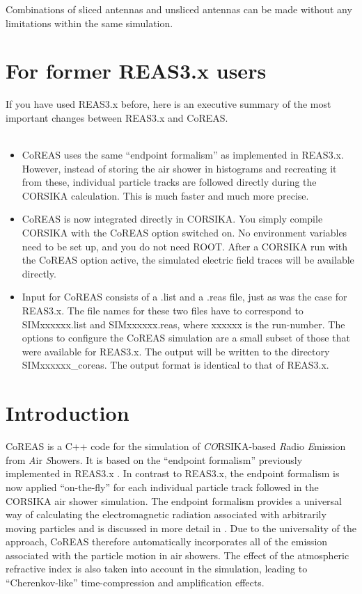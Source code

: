 \documentclass[a4paper,10pt]{article}
\begin{document}
Combinations of sliced antennas and unsliced antennas can be made without any limitations within the same simulation.

\section{For former REAS3.x users}

If you have used REAS3.x before, here is an executive summary of the most important changes between REAS3.x and CoREAS.\\ \\

\begin{itemize}
\item{CoREAS uses the same ``endpoint formalism'' as implemented in REAS3.x. However, instead of storing the air shower in histograms and recreating it from these, individual particle tracks are followed directly during the CORSIKA calculation. This is much faster and much more precise.}
\item{CoREAS is now integrated directly in CORSIKA. You simply compile CORSIKA with the CoREAS option switched on. No environment variables need to be set up, and you do not need ROOT. After a CORSIKA run with the CoREAS option active, the simulated electric field traces will be available directly.}
\item{Input for CoREAS consists of a .list and a .reas file, just as was the case for REAS3.x. The file names for these two files have to correspond to SIMxxxxxx.list and SIMxxxxxx.reas, where xxxxxx is the run-number. The options to configure the CoREAS simulation are a small subset of those that were available for REAS3.x. The output will be written to the directory SIMxxxxxx\_coreas. The output format is identical to that of REAS3.x.}
\end{itemize}

\clearpage

\section{Introduction}

CoREAS \citep{HuegeLudwigJames2013} is a C++ code for the simulation of {\em CO}RSIKA-based {\em R}adio {\em E}mission from {\em A}ir {\em S}howers. It is based on the ``endpoint formalism'' previously implemented in REAS3.x \citep{LudwigHuege2010}. In contrast to REAS3.x, the endpoint formalism is now applied ``on-the-fly'' for each individual particle track followed in the CORSIKA air shower simulation. The endpoint formalism provides a universal way of calculating the electromagnetic radiation associated with arbitrarily moving particles and is discussed in more detail in \citep{JamesFalckeHuege2010}. Due to the universality of the approach, CoREAS therefore automatically incorporates all of the emission associated with the particle motion in air showers. The effect of the atmospheric refractive index is also taken into account in the simulation, leading to ``Cherenkov-like'' time-compression and amplification effects.
\end{document}
